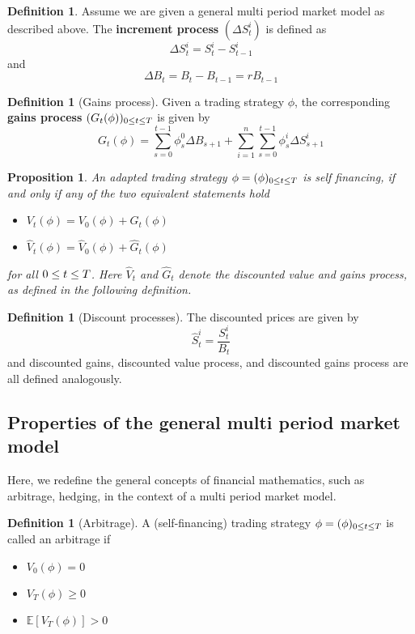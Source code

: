 \documentclass[10pt, oneside, reqno]{amsart}
\theoremstyle{plain}%
\newtheorem{prop}[thm]{Proposition}
\theoremstyle{definition}
\newtheorem{defn}[thm]{Definition}
\theoremstyle{remark}
\newcommand{\expc}[1]{\mathbb{E}\left[#1\right]}
\newcommand{\sumni}{\sum_{i=1}^n}
\begin{document}
\begin{defn}
		Assume we are given a general multi period market model as described above.  The \textbf{increment process} $(\Delta S^i_{t})$ is defined as \[
			\Delta S_t^i = S^i_t - S^i_{t-1}
		\]
		and \[
			\Delta B_t = B_t - B_{t-1} =  r B_{t-1} 
		\]
\end{defn}

\begin{defn}[Gains process]
	Given a trading strategy $\phi$, the corresponding \textbf{gains process} $(G_t(\phi))_{0 \leq t \leq T}$ is given by \[
		G_t(\phi) = \sum_{s=0}^{t-1} \phi_s^0 \Delta B_{s+1} + \sumni \sum_{s=0}^{t-1} \phi_s^i \Delta S^i_{s+1}
	\]
\end{defn} 

\begin{prop}
	An adapted trading strategy $\phi = (\phi)_{0 \leq t \leq T}$ is self financing, if and only if any of the two equivalent statements hold 
	\begin{itemize}
		\item $V_t(\phi) = V_0(\phi) + G_t(\phi)$
		\item $\hat{V}_t(\phi) = \hat{V}_0(\phi) + \hat{G}_t(\phi)$
	\end{itemize}
	for all $0 \leq t \leq T$.  Here $\hat{V}_t$ and $\hat{G}_t$ denote the discounted value and gains process, as defined in the following definition.
\end{prop}

\begin{defn}[Discount processes]
	The discounted prices are given by \[
		\hat{S}^i_t = \frac{S^i_t}{B_t}
	\] and discounted gains, discounted value process, and discounted gains process are all defined analogously.  
\end{defn}



\subsection{Properties of the general multi period market model} %
\label{sub:properties_of_the_general_multi_period_market_model}
Here, we redefine the general concepts of financial mathematics, such as arbitrage, hedging, in the context of a multi period market model.

\begin{defn}[Arbitrage]
	A (self-financing) trading strategy $\phi = (\phi)_{0 \leq t \leq T}$ is called an arbitrage if \begin{itemize}
		\item $V_0(\phi) = 0$
		\item $V_T(\phi) \geq 0$
		\item $\expc{V_T(\phi)} > 0$
	\end{itemize}
\end{defn}
\end{document}
